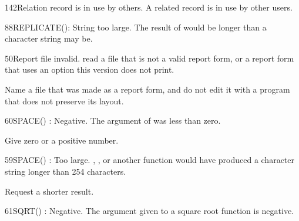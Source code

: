\begin{XbaseMessageEntry}{142}{Relation record is in use by others.}
A related record is in use by other users.
\end{XbaseMessageEntry}

\begin{XbaseMessageEntry}{88}{REPLICATE(): String too large.}
The result of  would be longer than a character string may be.
\end{XbaseMessageEntry}

\begin{XbaseMessageEntry}{50}{Report file invalid.}
 read a file that is not a valid report form, or a report form that uses an option this version does not print.

Name a file that was made as a report form, and do not edit it with a program that does not preserve its layout.
\end{XbaseMessageEntry}

\begin{XbaseMessageEntry}{60}{SPACE() : Negative.}
The argument of  was less than zero.

Give  zero or a positive number.
\end{XbaseMessageEntry}

\begin{XbaseMessageEntry}{59}{SPACE() : Too large.}
, ,  or another function would have produced a character string longer than 254 characters.

Request a shorter result.
\end{XbaseMessageEntry}

\begin{XbaseMessageEntry}{61}{SQRT() : Negative.}
The argument given to a square root function is negative.
\end{XbaseMessageEntry}


